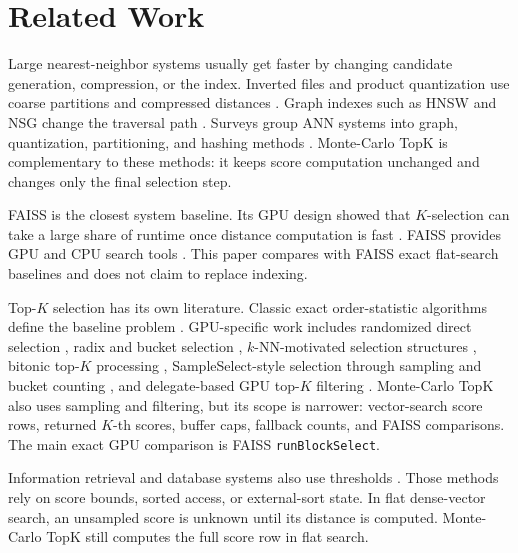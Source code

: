 \section{Related Work}

Large nearest-neighbor systems usually get faster by changing candidate
generation, compression, or the index. Inverted files and product quantization
use coarse partitions and compressed distances \citep{sivic2003video,jegou2011pq}.
Graph indexes such as HNSW and NSG change the traversal path
\citep{malkov2020hnsw,fu2019nsg}. Surveys group ANN systems into graph,
quantization, partitioning, and hashing methods \citep{aumuller2020ann}.
Monte-Carlo TopK is complementary to these methods: it keeps score computation
unchanged and changes only the final selection step.

FAISS is the closest system baseline. Its GPU design showed that $K$-selection
can take a large share of runtime once distance computation is fast
\citep{johnson2019billion}. FAISS provides GPU and CPU search tools
\citep{douze2024faiss,faiss2026software}. This paper compares with FAISS
exact flat-search baselines and does not claim to replace indexing.

Top-$K$ selection has its own literature. Classic exact order-statistic
algorithms define the baseline problem \citep{floyd1975select}. GPU-specific
work includes randomized direct selection \citep{monroe2011randomized}, radix
and bucket selection \citep{alabi2012fast}, $k$-NN-motivated selection
structures \citep{tang2015selection}, bitonic top-$K$ processing
\citep{shanbhag2018topk}, SampleSelect-style selection through sampling and
bucket counting \citep{ribizel2019approximate,ribizel2020parallel}, and
delegate-based GPU top-$K$ filtering \citep{gaihre2021drtopk}. Monte-Carlo TopK
also uses sampling and filtering, but its scope is narrower: vector-search score
rows, returned $K$-th scores, buffer caps, fallback counts, and FAISS
comparisons. The main exact GPU comparison is FAISS \texttt{runBlockSelect}.

Information retrieval and database systems also use thresholds
\citep{fagin2003optimal,broder2003wand,chronis2020external}. Those methods rely
on score bounds, sorted access, or external-sort state. In flat dense-vector
search, an unsampled score is unknown until its distance is computed. Monte-Carlo
TopK still computes the full score row in flat search.

